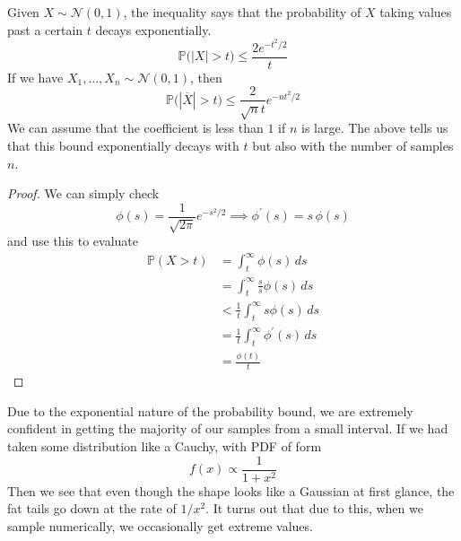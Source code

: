   \begin{theorem}
    Given $X \sim \mathcal{N}(0, 1)$, the inequality says that the probability of $X$ taking values past a certain $t$ decays exponentially. 
    \begin{equation}
      \mathbb{P} \big( |X| > t \big) \leq \frac{2 e^{-t^2/2}}{t}
    \end{equation}
    If we have $X_1, \ldots, X_n \sim \mathcal{N}(0, 1)$, then 
    \begin{equation}
      \mathbb{P} \big( |\overline{X}| > t \big) \leq \frac{2}{\sqrt{n} t} e^{-n t^2/2}
    \end{equation}
    We can assume that the coefficient is less than $1$ if $n$ is large. The above tells us that this bound exponentially decays with $t$ but also with the number of samples $n$. 
  \end{theorem}
  \begin{proof}
    We can simply check 
    \begin{equation}
      \phi(s) = \frac{1}{\sqrt{2\pi}} e^{-s^2/2} \implies \phi^\prime (s) = s \, \phi(s)
    \end{equation}
    and use this to evaluate
    \begin{align*}
      \mathbb{P}(X > t ) & = \int_t^\infty \phi(s) \,ds \\
      & = \int_t^\infty \frac{s}{s} \phi(s) \,ds \\
      & < \frac{1}{t} \int_t^\infty s \phi(s)\,ds \\
      & = \frac{1}{t} \int_t^\infty \phi^\prime (s)\,ds \\
      & = \frac{\phi(t)}{t}
    \end{align*}
  \end{proof}

  Due to the exponential nature of the probability bound, we are extremely confident in getting the majority of our samples from a small interval. If we had taken some distribution like a Cauchy, with PDF of form 
  \begin{equation}
    f(x) \propto \frac{1}{1 + x^2}
  \end{equation}
  Then we see that even though the shape looks like a Gaussian at first glance, the fat tails go down at the rate of $1/x^2$. It turns out that due to this, when we sample numerically, we occasionally get extreme values. 


